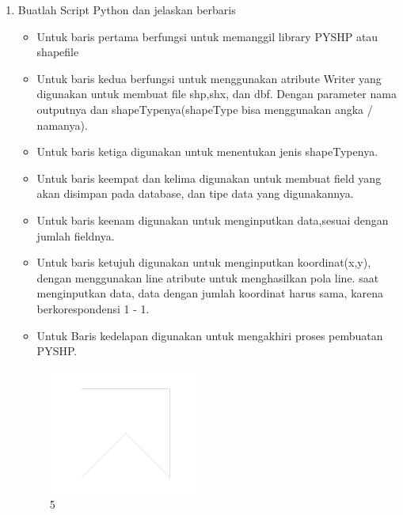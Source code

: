 \begin{enumerate}
	\item Buatlah Script Python dan jelaskan berbaris
	
	\begin{itemize}
		\item Untuk baris pertama berfungsi untuk memanggil library PYSHP atau shapefile
		\item Untuk baris kedua berfungsi untuk menggunakan atribute Writer yang digunakan untuk membuat file shp,shx, dan dbf. \hfill\break Dengan parameter nama outputnya dan shapeTypenya(shapeType bisa menggunakan angka / namanya).
		\item Untuk baris ketiga digunakan untuk menentukan jenis shapeTypenya.
		\item Untuk baris keempat dan kelima digunakan untuk membuat field yang akan disimpan pada database, dan tipe data yang digunakannya.
		\item Untuk baris keenam digunakan untuk menginputkan data,sesuai dengan jumlah fieldnya.
		\item Untuk baris ketujuh digunakan untuk menginputkan koordinat(x,y), dengan menggunakan line atribute untuk menghasilkan pola line. \hfill\break
		saat menginputkan data, data dengan jumlah koordinat harus sama, karena berkorespondensi 1 - 1.
		\item Untuk Baris kedelapan digunakan untuk mengakhiri proses pembuatan PYSHP.
	\end{itemize}
	\hfill\break
	\begin{figure}[H]
		\includegraphics[width=5cm]{figures/1174009/2/5.png}
		\centering
		\caption{5}
	\end{figure}


\end{enumerate}
